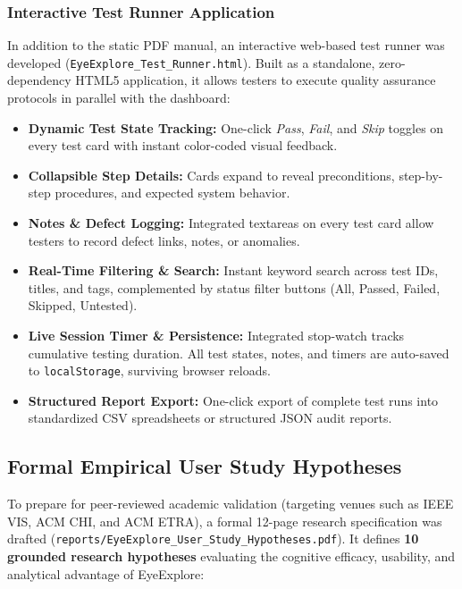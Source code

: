 \documentclass[11pt,a4paper]{article}
\begin{document}
\subsubsection{Interactive Test Runner Application}
In addition to the static PDF manual, an interactive web-based test runner was developed (\texttt{EyeExplore\_Test\_Runner.html}). Built as a standalone, zero-dependency HTML5 application, it allows testers to execute quality assurance protocols in parallel with the dashboard:
\begin{itemize}[noitemsep,topsep=2pt]
    \item \textbf{Dynamic Test State Tracking:} One-click \textit{Pass}, \textit{Fail}, and \textit{Skip} toggles on every test card with instant color-coded visual feedback.
    \item \textbf{Collapsible Step Details:} Cards expand to reveal preconditions, step-by-step procedures, and expected system behavior.
    \item \textbf{Notes \& Defect Logging:} Integrated textareas on every test card allow testers to record defect links, notes, or anomalies.
    \item \textbf{Real-Time Filtering \& Search:} Instant keyword search across test IDs, titles, and tags, complemented by status filter buttons (All, Passed, Failed, Skipped, Untested).
    \item \textbf{Live Session Timer \& Persistence:} Integrated stop-watch tracks cumulative testing duration. All test states, notes, and timers are auto-saved to \texttt{localStorage}, surviving browser reloads.
    \item \textbf{Structured Report Export:} One-click export of complete test runs into standardized CSV spreadsheets or structured JSON audit reports.
\end{itemize}

\subsection{Formal Empirical User Study Hypotheses}
To prepare for peer-reviewed academic validation (targeting venues such as IEEE VIS, ACM CHI, and ACM ETRA), a formal 12-page research specification was drafted (\texttt{reports/EyeExplore\_User\_Study\_Hypotheses.pdf}). It defines \textbf{10 grounded research hypotheses} evaluating the cognitive efficacy, usability, and analytical advantage of EyeExplore:
\end{document}
